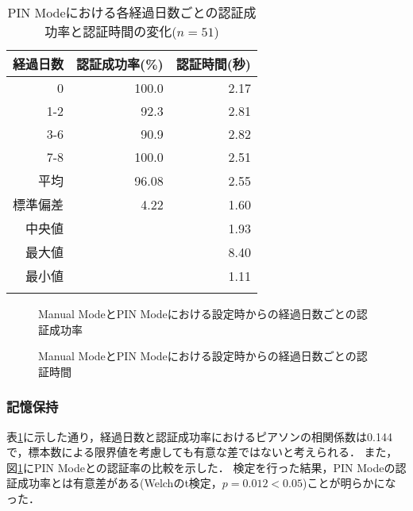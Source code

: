 \begin{table}[b]
  \caption{PIN Modeにおける各経過日数ごとの認証成功率と認証時間の変化($ n = 51 $)}
  \label{tab:manual.data}
  \begin{center}
    \small
    \begin{tabular}{rrr}
      \bhline
      経過日数 & 認証成功率(\%) & 認証時間(秒)\\ \hline
      0    & 100.0 & 2.17 \\
      1-2 & 92.3 & 2.81 \\
      3-6 & 90.9 & 2.82 \\
      7-8 & 100.0 & 2.51 \\ \hline \hline
      平均 & 96.08 & 2.55 \\
      標準偏差 & 4.22 & 1.60 \\
      中央値       & & 1.93 \\
      最大値       & & 8.40 \\
      最小値       & & 1.11 \\
      \bhline
    \end{tabular}
  \end{center}
\end{table}

\begin{figure}[t]
  \begin{center}
  \end{center}
  \caption{Manual ModeとPIN Modeにおける設定時からの経過日数ごとの認証成功率}
  \label{fig:ex_manual_vs_pin_rate}
\end{figure}

\begin{figure}[b]
  \begin{center}
  \end{center}
  \caption{Manual ModeとPIN Modeにおける設定時からの経過日数ごとの認証時間}
  \label{fig:ex_manual_vs_pin_time}
\end{figure}

\subsubsection{記憶保持}
表\ref{tab:manual.data}に示した通り，経過日数と認証成功率におけるピアソンの相関係数は0.144で，標本数による限界値\cite{978-4641121607}を考慮しても有意な差ではないと考えられる．
また，図\ref{fig:ex_manual_vs_pin_rate}にPIN Modeとの認証率の比較を示した．
検定を行った結果，PIN Modeの認証成功率とは有意差がある(Welchのt検定，$ p = 0.012 < 0.05 $)ことが明らかになった．


